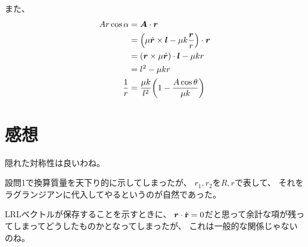 \documentclass[../ap_2014.tex]{subfiles}
\begin{document}
また、
\begin{equation}\begin{aligned}[b]
    Ar\cos\alpha &= \vb*{A}\cdot\vb*{r}\\
    &= \qty(\mu\dot{\vb*{r}}\times\vb*{l}-\mu k\frac{\vb*{r}}{r})\cdot\vb*{r}\\
    &=(\vb*{r}\times\mu\dot{\vb*{r}})\cdot\vb*{l}-\mu kr\\
    &= l^2 -\mu kr\\
    \frac{1}{r} &= \frac{\mu k}{l^2}\qty(1-\frac{A\cos\theta}{\mu k})
\end{aligned}\end{equation}

\section*{感想}
隠れた対称性は良いわね。

設問1で換算質量を天下り的に示してしまったが、
\(r_1,r_2\)を\(R,r\)で表して、
それをラグランジアンに代入してやるというのが自然であった。

LRLベクトルが保存することを示すときに、
\(\vb*{r}\cdot\dot{\vb{r}}=0\)だと思って余計な項が残ってしまってどうしたものかとなってしまったが、
これは一般的な関係じゃないのね。
\end{document}

